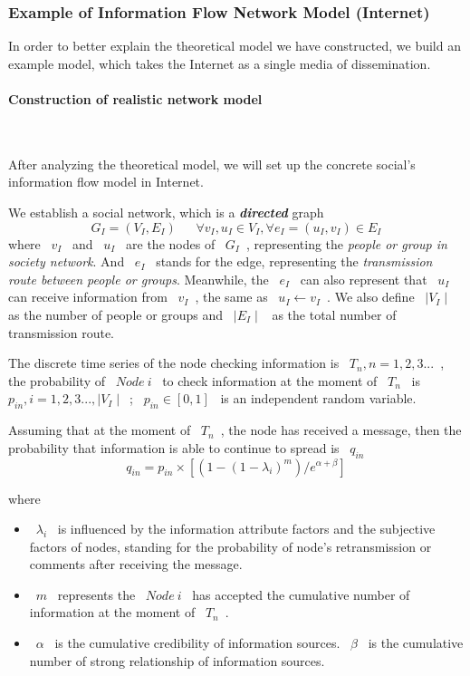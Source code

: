 \documentclass[a4paper,11pt]{article}
\begin{document}
\subsubsection{Example of Information Flow Network Model (Internet)}
\par In order to better explain the theoretical model we have constructed, we build an example model, which takes the Internet as a single media of dissemination.
\paragraph{Construction of realistic network model}
\textrm{\\}
\par After analyzing the theoretical model, we will set up the concrete social's information flow model in Internet.
\par We establish a social network, which is a \textbf{\emph{directed}} graph
\begin{equation}
G_I=(V_I,E_I)~~~~~~~\forall  v_I,u_I\in V_I , \forall e_I=(u_I,v_I)\in E_I
\end{equation}
where ~$v_I$~ and ~$u_I$~ are the nodes of ~$G_I$~, representing the \emph{people or group in society network}. And ~$e_I$~ stands for the edge, representing the \emph{transmission route between people or groups}. Meanwhile, the ~$e_I$~ can also represent that ~$u_I$~ can receive information from ~$v_I$~, the same as ~$u_I\leftarrow v_I$~. We also define ~$\mid V_I\mid$~ as the number of people or groups and ~$\mid E_I\mid$~ as the total number of transmission route.
\par The discrete time series of the node checking information is ~$T_n,n=1,2,3...$~, the probability of ~$Node~i$~ to check information at the moment of ~$T_n$~ is ~$p_{in},i=1,2,3...,\mid V_I\mid$~; ~$p_{in}\in [0,1]$~ is an independent random variable.
\par Assuming that at the moment of ~$T_n$~, the node has received a message, then the probability that information is able to continue to spread is ~$q_{in}$~
\begin{equation}
q_{in}=p_{in} \times [(1-(1-\lambda_{i})^m)/e^{\alpha +\beta}]
\end{equation}

where 
\begin{itemize}
\item ~$\lambda_{i}$~ is influenced by the information attribute factors and the subjective factors of nodes, standing for the probability of node's retransmission or comments after receiving the message.
\item ~$m$~ represents the ~$Node~i$~ has accepted the cumulative number of information at the moment of ~$T_n$~. 
\item ~$\alpha$~ is the cumulative credibility of information sources. ~$\beta$~ is the cumulative number of strong relationship of information sources.
\end{itemize}
\end{document}
